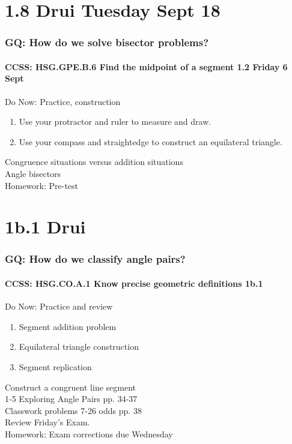 \documentclass{beamer}
\begin{document}
  \section{1.8 Drui Tuesday Sept 18}
  \frame
  {
    \frametitle{GQ: How do we solve bisector problems?}
    \framesubtitle{CCSS: HSG.GPE.B.6 Find the midpoint of a segment \hfill \alert{1.2 Friday 6 Sept}}

    \begin{block}{Do Now: Practice, construction}
    \begin{enumerate}
        \item Use your protractor and ruler to measure and draw.
        \item Use your compass and straightedge to construct an equilateral triangle.
    \end{enumerate}
    \end{block}
    Congruence situations versus addition situations\\
    Angle bisectors\\
    \vspace{1cm}
    Homework: Pre-test\\
  }
  
  \section{1b.1 Drui}
    \frame
    {
      \frametitle{GQ: How do we classify angle pairs?}
      \framesubtitle{CCSS: HSG.CO.A.1 Know precise geometric definitions  \alert{1b.1}}

      \begin{block}{Do Now: Practice and review}
      \begin{enumerate}
          \item Segment addition problem
          \item Equilateral triangle construction
          \item Segment replication
      \end{enumerate}
      \end{block}
      Construct a congruent line segment \\
      1-5 Exploring Angle Pairs pp. 34-37\\
      Classwork problems 7-26 odds pp. 38\\
      Review Friday's Exam.\\
      \vspace{0.5cm}
      Homework: Exam corrections due Wednesday\\
    }
\end{document}
